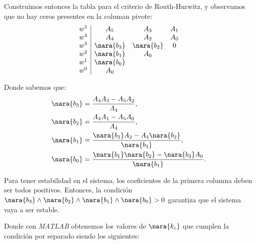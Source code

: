 Construimos entonces la tabla para el criterio de Routh-Hurwitz, y observamos
que no hay ceros presentes en la columan pivote:
\begin{equation}
  \begin{array}{c|ccc}
    w^5 & A_5 & A_3& A_1 \\
    w^4 & A_4 & A_2 & A_0 \\
    w^3 & \nara{b_3}  &  \nara{b_2} &0\\
    w^2 & \nara{b_1}  & A_0\\
    w^1 & \nara{b_0}\\
    w^0 & A_0
  \end{array}
\end{equation}

Donde sabemos que:
\begin{align}
    \nara{b_3} &= \frac{A_4 A_3 - A_5 A_2}{A_4},\\ 
    \nara{b_2} &= \frac{A_4 A_1 - A_5 A_0}{A_4},\\ 
    \nara{b_1} &= \frac{\nara{b_3} A_2 - A_4 \nara{b_2}}{\nara{b_3}},\\ 
    \nara{b_0} &= \frac{\nara{b_1} \nara{b_2} - \nara{b_3} A_0}{\nara{b_1}}.
  \end{align}

Para tener estabilidad en el sistema, los coeficientes de la primera columna
deben ser todos positivos. Entonces, la condición $\nara{b_3} \land \nara{b_2} \land\nara{b_1}\land\nara{b_0}>0$ garantiza
que el sistema vaya a ser estable.

Donde con \textit{MATLAB} obtenemos los valores de $\nara{k_c}$ que cumplen la condición por separado siendo los siguientes:


